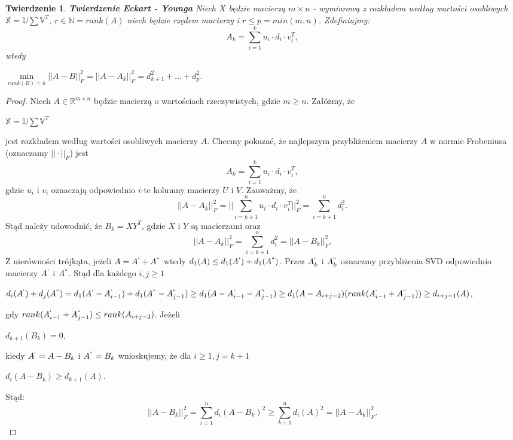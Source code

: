 \documentclass[12pt,a4paper]{report}
\newtheorem{tw}[df]{Twierdzenie}
\begin{document}
\begin{tw}\textbf{Twierdzenie Eckart - Younga}%
Niech $X$ będzie macierzą $m \times n$ - wymiarową z rozkładem według wartości osobliwych $\mathbb{X}=\mathbb{U}\sum \mathbb{V}^T$, $r\in \mathbb{N} = rank(A)$ niech będzie rzędem macierzy i $r\leq p = min(m,n)$.
Zdefiniujmy:
$$A_k = \sum_{i=1}^k u_i\cdot d_i \cdot v_i^T,$$
wtedy
\begin{center}
$\min \limits_{rank(B) = k } ||A - B||_F^2 = ||A - A_k||_F^2 = d_{k+1}^2 + ... + d_p^2$.
\end{center}
\end{tw}
\begin{proof}
Niech $A \in \mathbb{R}^{m\times n}$ będzie macierzą o wartościach rzeczywistych, gdzie $m\geq n$.
Załóżmy, że
\begin{center}
$\mathbb{X}=\mathbb{U}\sum \mathbb{V}^T$
\end{center} 
jest rozkładem według wartości osobliwych macierzy $A$.
Chcemy pokazać, że najlepszym przybliżeniem macierzy $A$ w normie Frobeniusa (oznaczamy $||\cdot||_F$) jest
$$A_k = \sum_{i=1}^k u_i\cdot d_i \cdot v_i^T,$$
gdzie $u_i$ i $v_i$ oznaczają odpowiednio $i$-te kolumny macierzy $U$ i $V$.
Zauważmy, że
$$||A - A_k||_F^2 = ||\sum_{i=k+1}^n u_i \cdot d_i \cdot v_i^T||_F^2 = \sum_{i=k+1}^n d_i^2.$$
Stąd należy udowodnić, że $B_k = XY^T$, gdzie $X$ i $Y$ są macierzami oraz 
$$||A - A_k||_F^2 = \sum_{i=k+1}^n d_i^2 = ||A - B_k||_F^2.$$
Z nierówności trójkąta, jeżeli $A = A^{`} + A^{``}$ wtedy $d_1(A)\leq d_1(A^{`}) + d_1(A^{``})$. 
Przez $A_k^{`}$ i $A_k^{``}$ oznaczmy przybliżenia SVD odpowiednio macierzy $A^{`}$ i $A^{``}$. 
Stąd dla każdego $i,j \geq 1$
\begin{center}
$d_i(A^{`}) + d_j(A^{``}) = d_1(A^{`} - A_{i-1}^{`}) + d_1(A^{``} - A_{j-1}^{``})
\geq d_1(A-A_{i-1}^{`} - A_{j-1}^{``})
\geq d_1(A-A_{i+j-2})(rank(A_{i-1}^{`} + A_{j-1}^{``}))
\geq d_{i+j-1}(A)$,
\end{center}
gdy $rank(A_{i-1}^{`} + A_{j-1}^{``}) \leq rank (A_{i+j-2})$.
Jeżeli 
\begin{center}
$d_{k+1}(B_k)=0$,
\end{center} 
kiedy $A^{`} = A - B_k$ i $A^{``} = B_k$ wnioskujemy, że dla $i\geq 1, j= k+1$
\begin{center}
$d_i(A-B_k)\geq d_{k+1}(A)$.
\end{center}
Stąd:
$$||A - B_k||_F^2 = \sum_{i=1}^n d_i(A-B_k)^2\geq \sum_{k+1}^nd_i(A)^2 = ||A-A_k||_F^2.$$
\end{proof}
\end{document}
